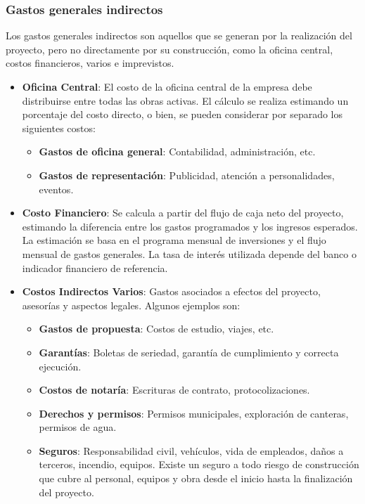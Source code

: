\subsubsection{Gastos generales indirectos}

Los gastos generales indirectos son aquellos que se generan por la realización del proyecto, pero no directamente por su construcción, como la oficina central, costos financieros, varios e imprevistos.

\begin{itemize}
    \item \textbf{Oficina Central}: El costo de la oficina central de la empresa debe distribuirse entre todas las obras activas. El cálculo se realiza estimando un porcentaje del costo directo, o bien, se pueden considerar por separado los siguientes costos:
    \begin{itemize}
        \item \textbf{Gastos de oficina general}: Contabilidad, administración, etc.
        \item \textbf{Gastos de representación}: Publicidad, atención a personalidades, eventos.
    \end{itemize}
    
    \item \textbf{Costo Financiero}: Se calcula a partir del flujo de caja neto del proyecto, estimando la diferencia entre los gastos programados y los ingresos esperados. La estimación se basa en el programa mensual de inversiones y el flujo mensual de gastos generales. La tasa de interés utilizada depende del banco o indicador financiero de referencia.
    
    \item \textbf{Costos Indirectos Varios}: Gastos asociados a efectos del proyecto, asesorías y aspectos legales. Algunos ejemplos son:
    \begin{itemize}
        \item \textbf{Gastos de propuesta}: Costos de estudio, viajes, etc.
        \item \textbf{Garantías}: Boletas de seriedad, garantía de cumplimiento y correcta ejecución.
        \item \textbf{Costos de notaría}: Escrituras de contrato, protocolizaciones.
        \item \textbf{Derechos y permisos}: Permisos municipales, exploración de canteras, permisos de agua.
        \item \textbf{Seguros}: Responsabilidad civil, vehículos, vida de empleados, daños a terceros, incendio, equipos. Existe un seguro a todo riesgo de construcción que cubre al personal, equipos y obra desde el inicio hasta la finalización del proyecto.
    \end{itemize}
\end{itemize}


